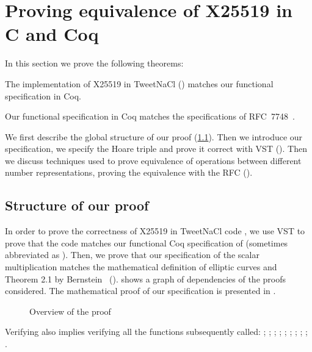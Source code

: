 \section{Proving equivalence of X25519 in C and Coq}
\label{sec:C-Coq-RFC}

In this section we prove the following theorems:
\begin{theorem}
\label{thm:VST}
The implementation of X25519 in TweetNaCl () matches our
functional specification in Coq.
\end{theorem}

\begin{theorem}
\label{thm:RFC}
Our functional specification in Coq matches the specifications of RFC~7748~\cite{rfc7748}.
\end{theorem}

We first describe the global structure of our proof (\ref{subsec:proof-structure}).
Then we introduce our specification, we specify the Hoare triple and prove it
correct with VST ().
Then we discuss techniques used to prove equivalence of operations between
different number representations,
proving the equivalence with the RFC ().





\subsection{Structure of our proof}
\label{subsec:proof-structure}

In order to prove the correctness of X25519 in TweetNaCl code ,
we use VST to prove that the code matches our functional Coq specification of 
(sometimes abbreviated as ). Then, we prove that our specification of the scalar
multiplication matches the mathematical definition of elliptic curves and Theorem 2.1 by
Bernstein~\cite{Ber06} ().
 shows a graph of dependencies of the proofs considered.
The mathematical proof of our specification is presented
in .
\begin{figure}[h]
  \centering
  
  \caption{Overview of the proof}
  \label{tikz:ProofOverview}
\end{figure}

Verifying  also implies verifying all the functions
subsequently called: ; ; ; ;
; ; ; ; ;
.

